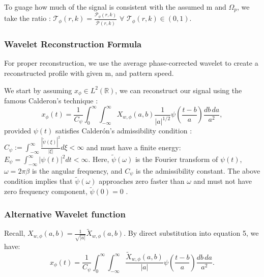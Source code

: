 \documentclass{article}
\begin{document}
To guage how much of the signal is consistent with the assumed m and $\Omega_{p}$, we take the ratio \cite{Hedman_2013}:  $\mathcal{T}_{\phi}(r,k) = \frac{\mathcal{P}_{\phi}(r,k)}{\bar{\mathcal{P}}(r,k)}$ $\forall$ $\mathcal{T}_{\phi}(r,k) \in (0,1)$.








\subsubsection{Wavelet Reconstruction Formula}
For proper reconstruction, we use the average phase-corrected wavelet to create a reconstructed profile with given m, and pattern speed. 

We start by assuming $x_{\phi}\in L^2(\mathbb{R})$, we can reconstruct our signal using the famous Calderon's technique \cite{Caldern1964IntermediateSA}\cite{pereyra2012harmonic}\cite{Roy_2022}\cite{APracticalGuidetoWaveletAnalysis}:
\begin{equation}
x_{\phi}(t) = \frac{1}{C_{\psi}} \int_{0}^{\infty} \int_{-\infty}^{\infty} X_{w,\phi}(a,b) \frac{1}{|a|^{1/2}} \psi\left(\frac{t-b}{a}\right) \frac{db \, da}{a^{2}},
\end{equation}
provided $\psi(t)$ satisfies Calderón's admissibility condition \cite{Caldern1964IntermediateSA}: $C_{\psi} := \int_{-\infty}^{\infty} \frac{|\tilde{\psi}(\xi)|^2}{|\xi|} d\xi < \infty$ and must have a finite energy\cite{Roy_2022}\cite{APracticalGuidetoWaveletAnalysis}: $E_{\psi} = \int_{-\infty}^{\infty} |\psi(t)|^2 dt < \infty$. Here, $\tilde\psi(\omega)$ is the Fourier transform of $\psi(t)$, $\omega = 2\pi \mathcal{\beta}$ is the angular frequency, and $C_{\psi}$ is the admissibility constant. The above condition implies that $\tilde\psi(\omega)$ approaches zero faster than $\omega$ and must not have zero frequency component, $\tilde\psi(0)=0$ \cite{Roy_2022}.






\subsubsection{Alternative Wavelet function}
Recall, $X_{w,\phi}(a,b)=\frac{1}{\sqrt{|a|}}\tilde{X}_{w,\phi}(a,b)$. By direct substitution into equation 5, we have:
\begin{equation} 
x_{\phi}(t) = \frac{1}{C_{\psi}} \int_{0}^{\infty} \int_{-\infty}^{\infty}\frac{\tilde{X}_{w,\phi}(a,b)}{|a|} \psi\left(\frac{t-b}{a}\right) \frac{db \, da}{a^{2}}.
\end{equation}
\end{document}
